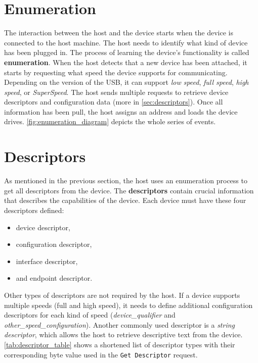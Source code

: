 \section{Enumeration}
\label{sec:enumeration}
The interaction between the host and the device starts when the device is connected to the host machine. The host needs to identify what kind of device has been plugged in. The process of learning the device's functionality is called \textbf{enumeration}. When the host detects that a new device has been attached, it starts by requesting what speed the device supports for communicating. Depending on the version of the USB, it can support \emph{low speed}, \emph{full speed}, \emph{high speed}, or \emph{SuperSpeed}. The host sends multiple requests to retrieve device descriptors and configuration data (more in \autoref{sec:descriptors}). Once all information has been pull, the host assigns an address and loads the device drives. \autoref{fig:enumeration_diagram} depicts the whole series of events.

\section{Descriptors}
\label{sec:descriptors}

As mentioned in the previous section, the host uses an enumeration process to get all descriptors from the device. The \textbf{descriptors} contain crucial information that describes the capabilities of the device. Each device must have these four descriptors defined:
\begin{itemize}
    \item device descriptor,
    \item configuration descriptor,
    \item interface descriptor,
    \item and endpoint descriptor.
\end{itemize}

Other types of descriptors are not required by the host. If a device supports multiple speeds (full and high speed), it needs to define additional configuration descriptors for each kind of speed (\emph{device\_qualifier} and \emph{other\_speed\_configuration}). Another commonly used descriptor is a \emph{string descriptor}, which allows the host to retrieve descriptive text from the device. \autoref{tab:descriptor_table} shows a shortened list of descriptor types with their corresponding byte value used in the \verb|Get Descriptor| request.

